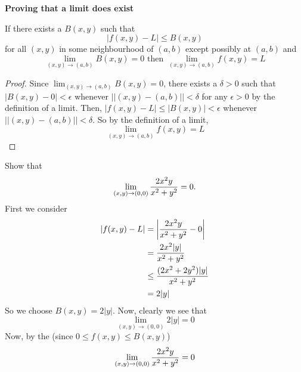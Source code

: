 \documentclass[english, 11pt]{article}
\begin{document}
  \textbf{Proving that a limit does exist}

  \begin{thrm}\label{squeeze}
    If there exists a $B(x,y)$ such that
    \[ |f(x,y) - L| \leq B(x,y) \]
    for all $(x,y)$ in some neighbourhood of $(a,b)$ except possibly at $(a,b)$ and
    \[ \lim_{(x,y) \rightarrow (a,b)} B(x,y) = 0 \mbox{ \ \ \ then \ \ \ } \lim_{(x,y) \rightarrow (a,b)} f(x,y) = L\]
  \end{thrm}

  \begin{proof}
    Since $\lim_{(x,y)\rightarrow(a,b)} B(x,y) = 0$, there exists a $\delta > 0$ such that $|B(x,y) - 0| < \epsilon$ whenever $ ||(x,y)-(a,b)|| < \delta $ for any $\epsilon > 0$ by the definition of a limit. Then, $|f(x,y) - L| \leq |B(x,y)| < \epsilon$
    whenever $||(x,y) - (a,b)|| < \delta$. So by the definition of a limit,
    \[ \lim_{(x,y)\rightarrow(a,b)}f(x,y) = L \]
  \end{proof}

  \begin{exmp}
    Show that
    \[ \lim_{(x,y)\rightarrow(0,0)}\frac{2x^2y}{x^2 + y^2} = 0. \]
    First we consider
    \begin{align*}
      |f(x,y) - L| & = \left| \frac{2x^2y}{x^2+y^2} - 0 \right| \\
                   & = \frac{2x^2|y|}{x^2+y^2} \\
                   & \leq \frac{(2x^2 + 2y^2)|y|}{x^2+y^2} \\
                   & = 2|y|
    \end{align*}
    So we choose $B(x,y) = 2|y|$. Now, clearly we see that
    \[ \lim_{(x,y)\rightarrow(0,0)} 2|y| = 0 \]
    Now, by the  (since $0 \leq f(x,y) \leq B(x,y)$)
    \[ \lim_{(x,y)\rightarrow(0,0)} \frac{2x^2y}{x^2+y^2} = 0 \]
  \end{exmp}
\end{document}
